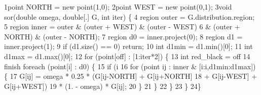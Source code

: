 \begin{tightcode}
\quad\num{1}point NORTH = new point(1,0);
\quad\num{2}point WEST  = new point(0,1);
\quad\num{3}void sor(double omega, double[.] G, int iter) \{
\quad\num{4}  region outer = G.distribution.region;
\quad\num{5}  region inner = outer & (outer + WEST)  & (outer - WEST)
\quad\num{6}                       & (outer + NORTH) & (outer - NORTH);
\quad\num{7}  region d0 = inner.project(0);
\quad\num{8}  region d1 = inner.project(1);
\quad\num{9}  if (d1.size() == 0) return;
\quad\num{10}  int d1min = d1.min()[0];
\quad\num{11}  int d1max = d1.max()[0];
\quad\num{12}  for (point[off] : [1:iter*2]) \{
\quad\num{13}    int red\_black = off %
\quad\num{14}    finish foreach (point[i] : d0) \{
\quad\num{15}      if (i %
\quad\num{16}        for (point ij : inner & [i:i,d1min:d1max]) \{
\quad\num{17}          G[ij] = omega * 0.25 * (G[ij-NORTH] + G[ij+NORTH]
\quad\num{18}                                + G[ij-WEST]  + G[ij+WEST])
\quad\num{19}                * (1. - omega) * G[ij];
\quad\num{20}        \}
\quad\num{21}      \}
\quad\num{22}    \}
\quad\num{23}  \}
\quad\num{24}\}
\end{tightcode}
